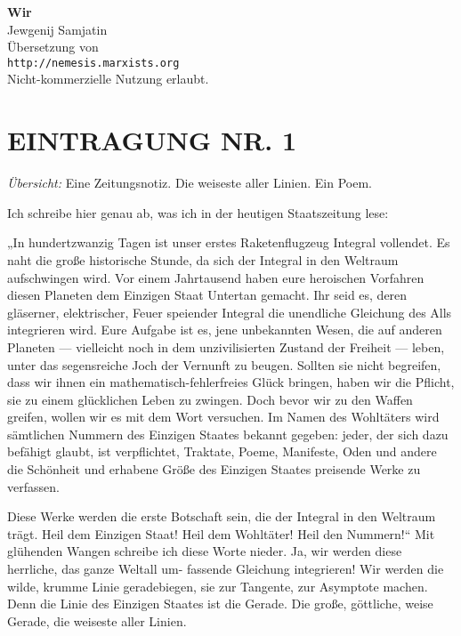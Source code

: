 \usepackage[ngerman]{babel}
\usepackage[T1]{fontenc}
\usepackage{textcomp}



\newcommand{\uebersicht}[1]{#1\medskip\par\noindent}
\newcommand\wurzel{$\sqrt{-1}$}


\raggedbottom
\begin{center}
\textbf{\huge\textsf{Wir}}\\
\bigskip
{\large Jewgenij Samjatin}\\
\bigskip
Übersetzung von\\
\texttt{http://nemesis.marxists.org}\\
\bigskip
Nicht-kommerzielle Nutzung erlaubt.
\end{center}

\section{EINTRAGUNG NR. 1}

\uebersicht{\emph{Übersicht:} Eine Zeitungsnotiz. Die weiseste
aller Linien. Ein Poem.}
Ich schreibe hier genau ab, was ich in der heutigen Staatszeitung
lese:

„In hundertzwanzig Tagen ist unser erstes Raketenflugzeug Integral
vollendet. Es naht die große historische Stunde, da sich der
Integral in den Weltraum aufschwingen wird. Vor einem Jahrtausend
haben eure heroischen Vorfahren diesen Planeten dem Einzigen Staat
Untertan gemacht. Ihr seid es, deren gläserner, elektrischer, Feuer
speiender Integral die unendliche Gleichung des Alls integrieren
wird. Eure Aufgabe ist es, jene unbekannten Wesen, die auf anderen
Planeten — vielleicht noch in dem unzivilisierten Zustand der
Freiheit — leben, unter das segensreiche Joch der Vernunft zu
beugen. Sollten sie nicht begreifen, dass wir ihnen ein
mathematisch-fehlerfreies Glück bringen, haben wir die Pflicht, sie
zu einem glücklichen Leben zu zwingen. Doch bevor wir zu den Waffen
greifen, wollen wir es mit dem Wort versuchen. Im Namen des
Wohltäters wird sämtlichen Nummern des Einzigen Staates bekannt
gegeben: jeder, der sich dazu befähigt glaubt, ist verpflichtet,
Traktate, Poeme, Manifeste, Oden und andere die Schönheit und
erhabene Größe des Einzigen Staates preisende Werke zu verfassen.

Diese Werke werden die erste Botschaft sein, die der Integral in
den Weltraum trägt. Heil dem Einzigen Staat! Heil dem Wohltäter!
Heil den Nummern!“ Mit glühenden Wangen schreibe ich diese Worte
nieder. Ja, wir werden diese herrliche, das ganze Weltall um-
fassende Gleichung integrieren! Wir werden die wilde, krumme Linie
geradebiegen, sie zur Tangente, zur Asymptote machen. Denn die
Linie des Einzigen Staates ist die Gerade. Die große, göttliche,
weise Gerade, die weiseste aller Linien.

